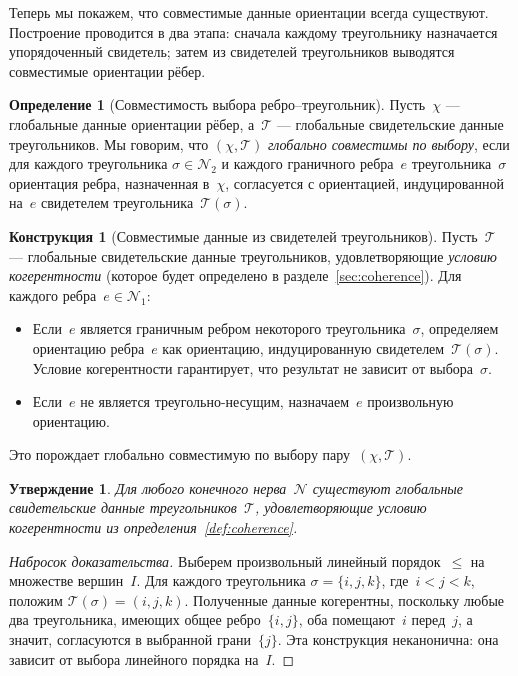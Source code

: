 \documentclass[11pt,a4paper]{article}
\theoremstyle{plain}
\newtheorem{proposition}[theorem]{Утверждение}
\theoremstyle{definition}
\newtheorem{definition}[theorem]{Определение}
\newtheorem{construction}[theorem]{Конструкция}
\theoremstyle{remark}
\newcommand{\cN}{\mathcal{N}}
\newcommand{\cT}{\mathcal{T}}
\begin{document}
Теперь мы покажем, что совместимые данные ориентации всегда существуют.
Построение проводится в два этапа: сначала каждому треугольнику
назначается упорядоченный свидетель; затем из свидетелей треугольников
выводятся совместимые ориентации рёбер.

\begin{definition}[Совместимость выбора ребро--треугольник]
\label{def:edge-triangle-compat}
Пусть~$\chi$ --- глобальные данные ориентации рёбер, а~$\cT$ ---
глобальные свидетельские данные треугольников. Мы говорим, что
$(\chi, \cT)$ \emph{глобально совместимы по выбору}, если для каждого
треугольника $\sigma \in \cN_2$ и каждого граничного ребра~$e$
треугольника~$\sigma$ ориентация ребра, назначенная в~$\chi$, согласуется
с ориентацией, индуцированной на~$e$ свидетелем
треугольника~$\cT(\sigma)$.
\end{definition}

\begin{construction}[Совместимые данные из свидетелей треугольников]
\label{con:from-witnesses}
Пусть~$\cT$ --- глобальные свидетельские данные треугольников,
удовлетворяющие \emph{условию когерентности} (которое будет определено
в разделе~\ref{sec:coherence}). Для каждого ребра~$e \in \cN_1$:
\begin{itemize}[nosep]
  \item Если~$e$ является граничным ребром некоторого
        треугольника~$\sigma$, определяем ориентацию ребра~$e$ как
        ориентацию, индуцированную свидетелем~$\cT(\sigma)$.
        Условие когерентности гарантирует, что результат не зависит
        от выбора~$\sigma$.
  \item Если~$e$ не является треугольно-несущим, назначаем~$e$
        произвольную ориентацию.
\end{itemize}
Это порождает глобально совместимую по выбору пару~$(\chi, \cT)$.
\end{construction}

\begin{proposition}
\label{prop:coherent-exists}
Для любого конечного нерва~$\cN$ существуют глобальные свидетельские
данные треугольников~$\cT$, удовлетворяющие условию когерентности из
определения~\ref{def:coherence}.
\end{proposition}

\begin{proof}[Набросок доказательства]
Выберем произвольный линейный порядок~$\leq$ на множестве вершин~$I$.
Для каждого треугольника $\sigma = \{i,j,k\}$, где~$i < j < k$,
положим $\cT(\sigma) = (i,j,k)$.
Полученные данные когерентны, поскольку любые два треугольника,
имеющих общее ребро~$\{i,j\}$, оба помещают~$i$ перед~$j$, а значит,
согласуются в выбранной грани~$\{j\}$. Эта конструкция неканонична:
она зависит от выбора линейного порядка на~$I$.
\end{proof}
\end{document}
